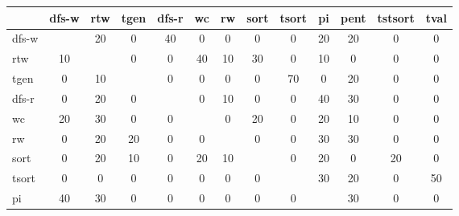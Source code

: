 %    
\begin{table}
    \begin{tabular}{|l|c|c|c|c|c|c|c|c|c|c|c|c|}
    	\hline
    	              & \acs{dfs-w} & \acs{rtw} & \acs{tgen} & \acs{dfs-r} & \acs{wc} & \acs{rw} & \acs{sort} & \acs{tsort} & \acs{pi} & \acs{pent} & \acs{tstsort} & \acs{tval} \\ \hline
    	\acs{dfs-w}   &             &    20     &     0      &     40      &    0     &    0     &     0      &      0      &    20    &     20     &       0       &     0      \\ \hline
    	\acs{rtw}     &     10      &           &     0      &      0      &    40    &    10    &     30     &      0      &    10    &     0      &       0       &     0      \\ \hline
    	\acs{tgen}    &      0      &    10     &            &      0      &    0     &    0     &     0      &     70      &    0     &     20     &       0       &     0      \\ \hline
    	\acs{dfs-r}   &      0      &    20     &     0      &             &    0     &    10    &     0      &      0      &    40    &     30     &       0       &     0      \\ \hline
    	\acs{wc}      &     20      &    30     &     0      &      0      &          &    0     &     20     &      0      &    20    &     10     &       0       &     0      \\ \hline
    	\acs{rw}      &      0      &    20     &     20     &      0      &    0     &          &     0      &      0      &    30    &     30     &       0       &     0      \\ \hline
    	\acs{sort}    &      0      &    20     &     10     &      0      &    20    &    10    &            &      0      &    20    &     0      &      20       &     0      \\ \hline
    	\acs{tsort}   &      0      &     0     &     0      &      0      &    0     &    0     &     0      &             &    30    &     20     &       0       &     50     \\ \hline
    	\acs{pi}      &     40      &    30     &     0      &      0      &    0     &    0     &     0      &      0      &          &     30     &       0       &     0      \\ \hline

\end{tabular}
\end{table}
